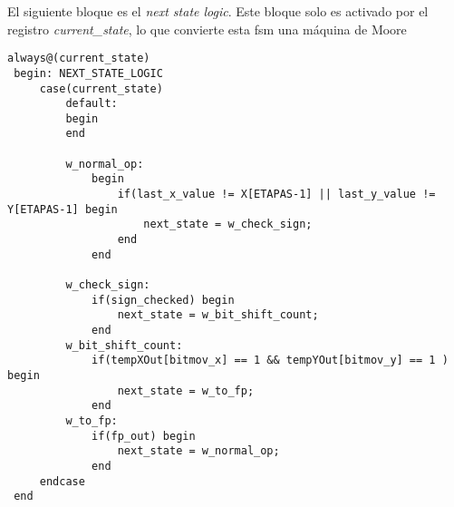 El siguiente bloque es el \textit{next state logic}. Este bloque solo es activado por el registro \textit{current\_state}, lo que convierte esta \gls{fsm} una máquina de Moore 

\begin{lstlisting}
always@(current_state)
 begin: NEXT_STATE_LOGIC
     case(current_state)
         default:
         begin
         end

         w_normal_op:
             begin
                 if(last_x_value != X[ETAPAS-1] || last_y_value != Y[ETAPAS-1] begin
                     next_state = w_check_sign;
                 end
             end

         w_check_sign:
             if(sign_checked) begin
                 next_state = w_bit_shift_count;
             end
         w_bit_shift_count:
             if(tempXOut[bitmov_x] == 1 && tempYOut[bitmov_y] == 1 ) begin
                 next_state = w_to_fp;
             end
         w_to_fp:
             if(fp_out) begin
                 next_state = w_normal_op;
             end
     endcase
 end

\end{lstlisting}


